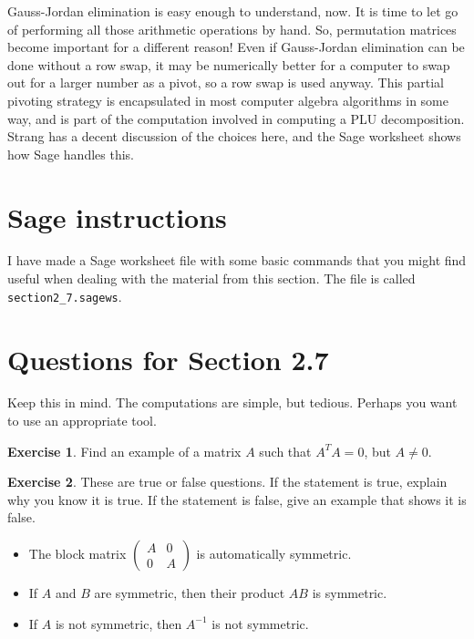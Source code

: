 \documentclass[11pt]{amsart}
\theoremstyle{definition}
\newtheorem{exercise}{Exercise}
\begin{document}
Gauss-Jordan elimination is easy enough to understand, now. It is time to let go of performing all those arithmetic operations by hand. So, permutation matrices become important for a different reason! Even if Gauss-Jordan elimination can be done without a row swap, it may be numerically better for a computer to swap out for a larger number as a pivot, so a row swap is used anyway. This partial pivoting strategy is encapsulated in most computer algebra algorithms in some way, and is part of the computation involved in computing a PLU decomposition. Strang has a decent discussion of the choices here, and the Sage worksheet shows how Sage handles this.

\section{Sage instructions}

I have made a Sage worksheet file with some basic commands that you might find useful when dealing with the material from this section. The file is called \texttt{section2\_7.sagews}.


\section{Questions for Section 2.7}
\setcounter{exercise}{71}

Keep this in mind. The computations are simple, but tedious. Perhaps you want to use an appropriate tool.

\begin{exercise}
Find an example of a matrix $A$ such that $A^T A = 0$, but $A \neq 0$.
\end{exercise}


\begin{exercise}
These are true or false questions. If the statement is true, explain why you know it is true. If the statement is false, give an example that shows it is false.
\begin{itemize}
\item The block matrix $\left( \begin{smallmatrix} A & 0 \\ 0 & A \end{smallmatrix}\right)$ is automatically symmetric.

\item If $A$ and $B$ are symmetric, then their product $AB$ is symmetric.

\item If $A$ is not symmetric, then $A^{-1}$ is not symmetric.

\end{itemize}
\end{exercise}
\end{document}

